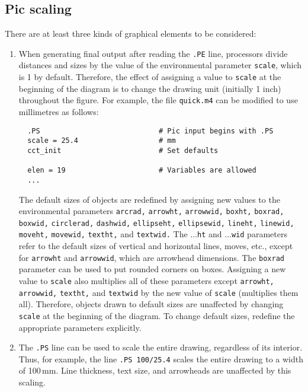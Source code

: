 \subsection{Pic scaling\label{Picscaling:}}
There are at least three kinds of graphical elements to be considered:
\begin{enumerate}
\item When generating final output after reading the {\tt.PE} line,
  \pic processors divide distances and sizes by the value of the
  environmental parameter {\tt scale}, which is 1 by default.  Therefore,
  the effect of assigning a value to {\tt scale} at the beginning of the
  diagram is to change the drawing unit (initially 1 inch) throughout
  the figure.  For example, the file {\tt quick.m4} can be modified to
  use millimetres as follows:
  \begin{verbatim}
  .PS                            # Pic input begins with .PS
  scale = 25.4                   # mm
  cct_init                       # Set defaults

  elen = 19                      # Variables are allowed
  ...
  \end{verbatim}
\vspace*{-1.5\baselineskip}
  The default sizes of \pic objects
  are redefined by assigning new values to the environmental parameters
  {\tt arcrad,} {\tt arrowht,} {\tt arrowwid,} {\tt boxht,} {\tt boxrad,}
  {\tt boxwid,} {\tt circlerad,} {\tt dashwid,} {\tt ellipseht,}
  {\tt ellipsewid,} {\tt lineht,} {\tt linewid,} {\tt moveht,}
  {\tt movewid,}
  {\tt textht,} and {\tt textwid.}
  The $\ldots${\tt ht} and $\ldots${\tt wid} parameters refer to the
  default sizes of vertical and horizontal lines, moves, etc., except for
  {\tt arrowht} and {\tt arrowwid}, which are arrowhead dimensions.
  The {\tt boxrad} parameter can be used to put rounded corners on boxes.
  Assigning a new value to {\tt scale} also multiplies all of these 
  parameters except {\tt arrowht,} {\tt arrowwid,} {\tt textht,} and
  {\tt textwid} by the new value of {\tt scale} (\gpic multiplies them all).
  Therefore, objects drawn to default sizes are unaffected by changing
  {\tt scale} at the beginning of the diagram.
  To change default sizes, redefine the appropriate parameters explicitly.

\item The {\tt .PS} line can be used to scale the entire drawing, regardless
  of its interior.  Thus, for example, the line {\tt.PS 100/25.4}
  scales the entire drawing to a width of 100$\,$mm.
  Line thickness, text size, and \dpic arrowheads are unaffected by
  this scaling.


\end{enumerate}

